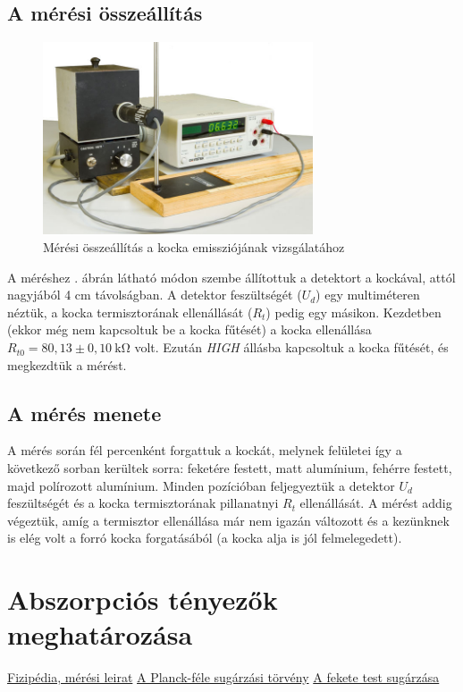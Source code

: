 \documentclass[a4paper, 12pt]{article}
\begin{document}
    \subsection{A mérési összeállítás}
    \begin{figure}[H]
        \centering
        \includegraphics[width=8cm]{632px-Homsug5}
        \caption{Mérési összeállítás a kocka emissziójának vizsgálatához}
        \label{fig:4ossze}
    \end{figure}

    A méréshez . ábrán látható módon szembe állítottuk a detektort a kockával, attól nagyjából 4 cm távolságban.
    A detektor feszültségét ($U_d$) egy multiméteren néztük, a kocka termisztorának ellenállását ($R_t$) pedig egy másikon.
    Kezdetben (ekkor még nem kapcsoltuk be a kocka fűtését) a kocka ellenállása $R_{t0}=80,13\pm 0,10~\mathrm{k\Omega}$ volt.
    Ezután \textit{HIGH} állásba kapcsoltuk a kocka fűtését, és megkezdtük a mérést.

    \subsection{A mérés menete}
    A mérés során fél percenként forgattuk a kockát, melynek felületei így a következő sorban kerültek sorra: feketére festett, matt alumínium, fehérre festett, majd polírozott alumínium.
    Minden pozícióban feljegyeztük a detektor $U_d$ feszültségét és a kocka termisztorának pillanatnyi $R_t$ ellenállását.
    A mérést addig végeztük, amíg a termisztor ellenállása már nem igazán változott és a kezünknek is elég volt a forró kocka forgatásából (a kocka alja is jól felmelegedett).


    \section{Abszorpciós tényezők meghatározása}

    \begin{thebibliography}

         \href{https://fizipedia.bme.hu/index.php/H%C5%91m%C3%A9rs%C3%A9kleti_sug%C3%A1rz%C3%A1s_vizsg%C3%A1lata}{Fizipédia, mérési leirat}
         \href{https://en.wikipedia.org/wiki/Planck%27s_law}{A Planck-féle sugárzási törvény}
         \href{https://glossary.periodni.com/glossary.php?en=blackbody+radiation}{A fekete test sugárzása}
    \end{thebibliography}
\end{document}

